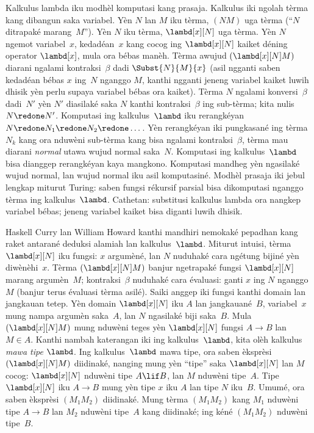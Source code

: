 \documentclass[../../../include/open-logic-section]{subfiles}
\begin{document}


Kalkulus lambda iku modhèl komputasi kang prasaja.
Kalkulus iki ngolah tèrma kang dibangun saka variabel.
Yèn $N$ lan $M$ iku tèrma, $(NM)$ uga tèrma
(``$N$ ditrapaké marang~$M$''). Yèn $N$ iku tèrma,
$\lambd[x][N]$ uga tèrma. Yèn $N$ ngemot variabel~$x$,
kedadéan~$x$ kang cocog ing $\lambd[x][N]$ kaiket
déning operator $\lambd[x]$, mula ora bébas manèh.
Tèrma awujud $(\lambd[x][N]M)$ diarani ngalami
kontraksi~$\beta$ dadi $\Subst{N}{M}{x}$
(asil ngganti saben kedadéan bébas $x$ ing~$N$
nganggo $M$, kanthi ngganti jeneng variabel kaiket
luwih dhisik yèn perlu supaya variabel bébas ora
kaiket). Tèrma $N$ ngalami konversi~$\beta$
dadi~$N'$ yèn $N'$ diasilaké saka $N$ kanthi
kontraksi~$\beta$ ing sub-tèrma; kita nulis
$N \redone N'$. Komputasi ing kalkulus~$\lambd$
iku rerangkéyan $N \redone N_1 \redone N_2 \redone \dots$.
Yèn rerangkéyan iki pungkasané ing tèrma $N_k$
kang ora nduwèni sub-tèrma kang bisa ngalami
kontraksi~$\beta$, tèrma mau diarani \emph{normal}
utawa wujud normal saka~$N$. Komputasi ing
kalkulus~$\lambd$ bisa dianggep rerangkéyan kaya
mangkono. Komputasi mandheg yèn ngasilaké wujud
normal, lan wujud normal iku asil komputasiné.
Modhèl prasaja iki jebul lengkap miturut Turing:
saben fungsi rékursif parsial bisa dikomputasi
nganggo tèrma ing kalkulus~$\lambd$.
Cathetan: substitusi kalkulus lambda ora nangkep variabel bébas; jeneng variabel kaiket bisa diganti luwih dhisik.

Haskell Curry lan William Howard kanthi mandhiri
nemokaké pepadhan kang raket antarané deduksi alamiah
lan kalkulus~$\lambd$. Miturut intuisi, tèrma
$\lambd[x][N]$ iku fungsi: $x$ argumèné, lan $N$
nuduhaké cara ngétung bijiné yèn diwènèhi~$x$.
Tèrma $(\lambd[x][N]M)$ banjur ngetrapaké fungsi
$\lambd[x][N]$ marang argumèn~$M$; kontraksi~$\beta$
nuduhaké cara évaluasi: ganti $x$ ing $N$ nganggo~$M$
(banjur terus évaluasi tèrma asilé). Saiki anggep
iki fungsi kanthi domain lan jangkauan tetep.
Yèn domain $\lambd[x][N]$ iku $A$ lan jangkauané~$B$,
variabel~$x$ mung nampa argumèn saka~$A$, lan $N$
ngasilaké biji saka~$B$. Mula $(\lambd[x][N]M)$ mung
nduwèni teges yèn $\lambd[x][N]$ fungsi $A \to B$
lan $M \in A$. Kanthi nambah katerangan iki ing
kalkulus~$\lambd$, kita olèh kalkulus \emph{mawa tipe}
$\lambd$. Ing kalkulus~$\lambd$ mawa tipe,
ora saben èksprèsi $(\lambd[x][N]M)$ diidinaké,
nanging mung yèn ``tipe'' saka $\lambd[x][N]$
lan $M$ cocog: $\lambd[x][N]$ nduwèni tipe
$A \lif B$, lan $M$ nduwèni tipe~$A$.
Tipe $\lambd[x][N]$ iku $A \to B$ mung yèn
tipe $x$ iku $A$ lan tipe $N$ iku~$B$.
Umumé, ora saben èksprèsi $(M_1M_2)$ diidinaké.
Mung tèrma $(M_1M_2)$ kang $M_1$ nduwèni tipe
$A \to B$ lan $M_2$ nduwèni tipe~$A$ kang
diidinaké; ing kéné $(M_1M_2)$ nduwèni tipe~$B$.
\end{document}
